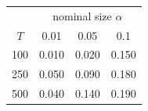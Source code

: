 % 
\begin{tabular}{cccc}
  \hline
  & \multicolumn{3}{c}{nominal size $\alpha$} \\
 $T$ & 0.01 & 0.05 & 0.1 \\
 \hline
100 & 0.010 & 0.020 & 0.150 \\ 
  250 & 0.050 & 0.090 & 0.180 \\ 
  500 & 0.040 & 0.140 & 0.190 \\ 
   \hline
\end{tabular}
